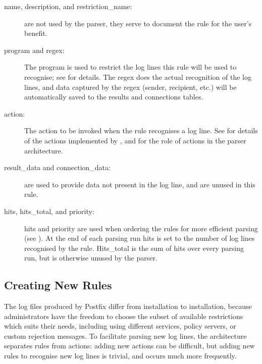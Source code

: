 \begin{description}

    \item [name, description, and restriction\_name:] are not used by the
        parser, they serve to document the rule for the user's benefit.

    \item [program and regex:] The program is used to restrict the log
        lines this rule will be used to recognise; see  for details.  The regex does the
        actual recognition of the log lines, and data captured by the regex
        (sender, recipient, etc.) will be automatically saved to the
        results and connections tables.

    \item [action:] The action to be invoked when the rule recognises a log
        line.  See  for
        details of the actions implemented by \parsername{}, and
         for the role of actions in the
        parser architecture.

    \item [result\_data and connection\_data:] are used to provide data not
        present in the log line, and are unused in this rule.

    \item [hits, hits\_total, and priority:] hits and priority are used
        when ordering the rules for more efficient parsing (see
        ).  At the end of each
        parsing run hits is set to the number of log lines recognised by
        the rule.  Hits\_total is the sum of hits over every parsing run,
        but is otherwise unused by the parser.

\end{description}

\subsection{Creating New Rules}

\label{creating new rules in implementation}

The log files produced by Postfix differ from installation to installation,
because administrators have the freedom to choose the subset of available
restrictions which suits their needs, including using different
 services, policy servers, or custom rejection messages.  To
facilitate parsing new log lines, the architecture separates rules from
actions: adding new actions can be difficult, but adding new rules to
recognise new log lines is trivial, and occurs much more frequently.


